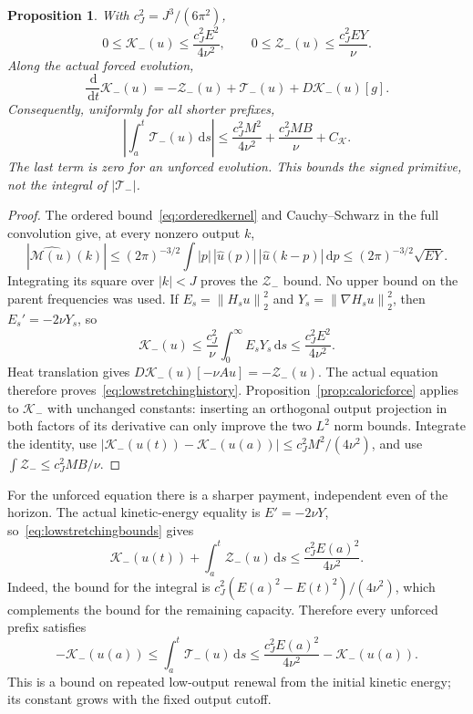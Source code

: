 \documentclass[11pt]{article}
\newtheorem{proposition}{Proposition}
\newcommand{\dd}{\,\mathrm d}
\newcommand{\norm}[1]{\left\lVert#1\right\rVert}
\begin{document}
\begin{proposition}\label{prop:lowstretching}
With $c_J^2=J^3/(6\pi^2)$,
\begin{equation}\label{eq:lowstretchingbounds}
 0\leq\mathcal K_-(u)\leq\frac{c_J^2E^2}{4\nu^2},\qquad
 0\leq\mathcal Z_-(u)\leq\frac{c_J^2EY}{\nu}.
\end{equation}
Along the actual forced evolution,
\begin{equation}\label{eq:lowstretchinghistory}
 \frac{\dd}{\dd t}\mathcal K_-(u)
       =-\mathcal Z_-(u)+\mathcal T_-(u)+D\mathcal K_-(u)[g].
\end{equation}
Consequently, uniformly for all shorter prefixes,
\[
 \left|\int_a^t\mathcal T_-(u)\dd s\right|
 \leq\frac{c_J^2M^2}{4\nu^2}+\frac{c_J^2MB}{\nu}+C_{\mathcal K}.
\]
The last term is zero for an unforced evolution. This bounds the signed
primitive, not the integral of $|\mathcal T_-|$.
\end{proposition}
\begin{proof}
The ordered bound~\eqref{eq:orderedkernel} and Cauchy--Schwarz in the
full convolution give, at every nonzero output $k$,
\[
 |\widehat{\mathcal M(u)}(k)|
 \leq(2\pi)^{-3/2}\int |p|\,|\widehat u(p)|\,
                  |\widehat u(k-p)|\dd p
 \leq(2\pi)^{-3/2}\sqrt{EY}.
\]
Integrating its square over $|k|<J$ proves the $\mathcal Z_-$ bound.
No upper bound on the parent frequencies was used. If $E_s=\norm{H_su}_2^2$
and $Y_s=\norm{\nabla H_su}_2^2$, then $E_s'=-2\nu Y_s$, so
\[
 \mathcal K_-(u)\leq\frac{c_J^2}{\nu}\int_0^\infty E_sY_s\dd s
                  \leq\frac{c_J^2E^2}{4\nu^2}.
\]
Heat translation gives $D\mathcal K_-(u)[-\nu Au]=-\mathcal Z_-(u)$.
The actual equation therefore proves~\eqref{eq:lowstretchinghistory}.
Proposition~\ref{prop:caloricforce} applies to $\mathcal K_-$ with
unchanged constants: inserting an orthogonal output projection in both
factors of its derivative can only improve the two $L^2$ norm bounds.
Integrate the identity, use
$|\mathcal K_-(u(t))-\mathcal K_-(u(a))|\leq c_J^2M^2/(4\nu^2)$,
and use $\int\mathcal Z_-\leq c_J^2MB/\nu$.
\end{proof}

For the unforced equation there is a sharper payment, independent even
of the horizon. The actual kinetic-energy equality is $E'=-2\nu Y$,
so~\eqref{eq:lowstretchingbounds} gives
\begin{equation}\label{eq:lowstretchingreserve}
 \mathcal K_-(u(t))+\int_a^t\mathcal Z_-(u)\dd s
 \leq \frac{c_J^2 E(a)^2}{4\nu^2}.
\end{equation}
Indeed, the bound for the integral is
$c_J^2(E(a)^2-E(t)^2)/(4\nu^2)$, which complements the bound for
the remaining capacity. Therefore every unforced prefix satisfies
\[
 -\mathcal K_-(u(a))\leq\int_a^t\mathcal T_-(u)\dd s
 \leq\frac{c_J^2 E(a)^2}{4\nu^2}-\mathcal K_-(u(a)).
\]
This is a bound on repeated low-output renewal from the initial kinetic
energy; its constant grows with the fixed output cutoff.
\end{document}
